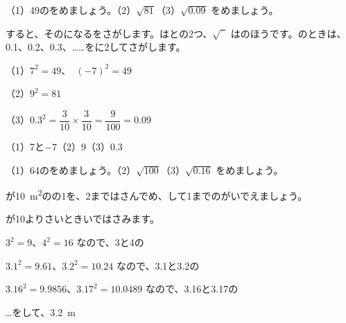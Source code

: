 
\begin{reidai}[\R{平方根}{へい|ほう|こん}を\R{求}{もと}める]
（1）49のをめましょう。（2）$\sqrt{81}$\quad（3）$\sqrt{0.09}$ をめましょう。\par
{}すると、そのになるをさがします。はとの2つ、$\sqrt{\phantom{2}}$ はのほうです。のときは、0.1、0.2、0.3、……をに2してさがします。\par
\shiki （1）$7^2=49$、\ $(-7)^2=49$\par
\hspace*{2.6\zw}（2）$9^2=81$\par
\hspace*{2.6\zw}（3）$0.3^2=\dfrac{3}{10}\times\dfrac{3}{10}=\dfrac{9}{100}=0.09$\par
\kotae （1）7と$-7$\quad（2）9\quad（3）0.3
\end{reidai}

\begin{jibun}
（1）64のをめましょう。（2）$\sqrt{100}$\quad（3）$\sqrt{0.16}$ をめましょう。
\end{jibun}

\begin{reidai}[はさみうちで1\R{辺}{ぺん}を\R{求}{もと}める]
が\qty{10}{m^2}のの1を、2まではさんでめ、して1までのがいでえましょう。\par
{}が10よりさいときいではさみます。\par
\shiki $3^2=9$、$4^2=16$ なので、3と4の\par
\hspace*{2.6\zw}$3.1^2=9.61$、$3.2^2=10.24$ なので、3.1と3.2の\par
\hspace*{2.6\zw}$3.16^2=9.9856$、$3.17^2=10.0489$ なので、3.16と3.17の\par
{}…をして、\qty{3.2}{m}
\end{reidai}

